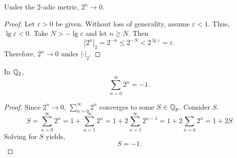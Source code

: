 \documentclass[notitlepage]{problem-solving}
\begin{document}
\begin{lemma}
	Under the 2-adic metric, $2^n\rightarrow 0$.
\end{lemma}
\begin{proof}
	Let $\varepsilon > 0$ be given.
	Without loss of generality, assume $\varepsilon < 1$.
	Thus, $\lg\varepsilon < 0$.
	Take $N > -\lg\varepsilon$ and let $n\geq N$.
	Then
	\[
		|2^n|_2 = 2^{-n} \leq 2^{-N} < 2^{\lg\varepsilon} = \varepsilon.
	\]
	Therefore, $2^n\rightarrow 0$ under $|\cdot|_2$.
\end{proof}

\begin{proposition}
	In $\mathbb{Q}_2$,
	\[
		\sum_{n=0}^\infty 2^n = -1.
	\]
\end{proposition}
\begin{proof}
	Since $2^n\rightarrow 0$, $\sum_{n=0}^\infty 2^n$ converges to some $S\in\mathbb{Q}_p$.
	Consider $S$.
	\[
		S= \sum_{n=0}^\infty 2^n = 1 + \sum_{n=1}^\infty 2^n = 1+ 2\sum_{n=1}^\infty 2^{n-1} = 1+ 2 \sum_{n=0} 2^n = 1+ 2S
	\]
	Solving for $S$ yields,
	\[
		S = -1.
	\]
\end{proof}

\printbibliography
\end{document}
